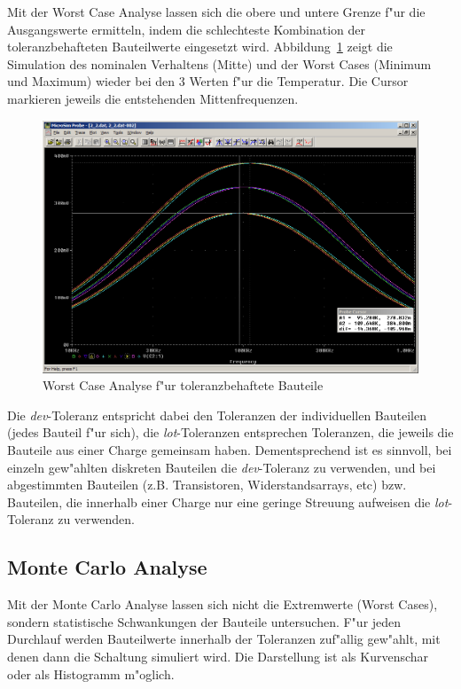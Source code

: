 Mit der Worst Case Analyse lassen sich die obere und untere Grenze f"ur die Ausgangswerte ermitteln, indem die schlechteste Kombination der toleranzbehafteten Bauteilwerte eingesetzt wird. Abbildung~\ref{fig:3_2_2_wc_fT_both} zeigt die Simulation des nominalen Verhaltens (Mitte) und der Worst Cases (Minimum und Maximum) wieder bei den 3 Werten f"ur die Temperatur. Die Cursor markieren jeweils die entstehenden Mittenfrequenzen.

\begin{figure}%
	\centering
	\includegraphics[width=\textwidth]{fig/bsp2/3_2_2_wc_fT_both.PNG}
	\caption{Worst Case Analyse f"ur toleranzbehaftete Bauteile}
	\label{fig:3_2_2_wc_fT_both}
\end{figure}

Die \emph{dev}-Toleranz entspricht dabei den Toleranzen der individuellen Bauteilen (jedes Bauteil f"ur sich), die \emph{lot}-Toleranzen entsprechen Toleranzen, die jeweils die Bauteile aus einer Charge gemeinsam haben. Dementsprechend ist es sinnvoll, bei einzeln gew"ahlten diskreten Bauteilen die \emph{dev}-Toleranz zu verwenden, und bei abgestimmten Bauteilen (z.B. Transistoren, Widerstandsarrays, etc) bzw. Bauteilen, die innerhalb einer Charge nur eine geringe Streuung aufweisen die \emph{lot}-Toleranz zu verwenden.


\subsection{Monte Carlo Analyse}

Mit der Monte Carlo Analyse lassen sich nicht die Extremwerte (Worst Cases), sondern statistische Schwankungen der Bauteile untersuchen. F"ur jeden Durchlauf werden Bauteilwerte innerhalb der Toleranzen zuf"allig gew"ahlt, mit denen dann die Schaltung simuliert wird. Die Darstellung ist als Kurvenschar oder als Histogramm m"oglich.

